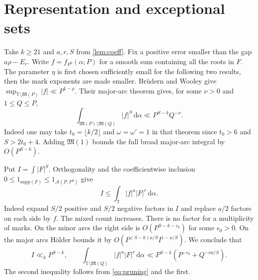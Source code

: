 \documentclass[11pt,letterpaper]{article}
\theoremstyle{definition}
\newcommand{\T}{\mathbb T}
\newcommand{\A}{\mathcal A}
\newcommand{\M}{\mathfrak M}
\newcommand{\dd}{\,\mathrm d}
\begin{document}
\section{Representation and exceptional sets}\label{sec:represent}
Take $k\ge21$ and $a,r,S$ from \cref{lem:coeff}. Fix a positive
error smaller than the gap $a\rho-E_r$. Write $f=f_{P^\eta}(\alpha;P)$
for a smooth sum containing all the roots in $F$.
The parameter $\eta$ is first chosen sufficiently small for the
following two results, then the mark exponents are made smaller.
Br\"udern and Wooley \cite[Theorem 1.1]{BWminor} give
$\sup_{\T\setminus\M(P)}|f|\ll P^{1-\rho}$.
Their major-arc theorem \cite[Theorem 1.3]{BWmajor} gives, for some
$\nu>0$ and $1\le Q\le P$,
\begin{equation}\label{eq:pruning}
 \int_{\M(P)\setminus\M(Q)}|f|^S\dd\alpha
 \ll P^{S-k}Q^{-\nu}.
\end{equation}
Indeed one may take $t_0=\lfloor k/2\rfloor$ and
$\omega=\omega'=1$ in that theorem since $t_0>6$ and $S>2t_0+4$.
Adding $\M(1)$ bounds the full broad major-arc integral by $O(P^{S-k})$.

Put $I=\int|F|^S$. Orthogonality and the coefficientwise inclusion
$0\le 1_{\mathrm{supp}(F)}\le1_{\A(P,P^\eta)}$ give
\begin{equation}\label{eq:orth}
 I\le\int_{\T}|f|^a|F|^r\dd\alpha .
\end{equation}
Indeed expand $S/2$ positive and $S/2$ negative factors in $I$ and
replace $a/2$ factors on each side by $f$. The mixed count increases.
There is no factor for a multiplicity of marks. On the minor arcs
the right side is $O(P^{S-k-\epsilon_0})$ for some $\epsilon_0>0$.
On the major arcs H\"older bounds it by
$O(P^{(S-k)a/S} I^{1-a/S})$. We conclude that
\begin{equation}\label{eq:sharp}
 I\ll_k P^{S-k},\qquad
 \int_{\T\setminus\M(Q)} |f|^a|F|^r\dd\alpha
 \ll P^{S-k}(P^{-\epsilon_0}+Q^{-\nu a/S}).
\end{equation}
The second inequality follows from \eqref{eq:pruning} and the first.
\end{document}
